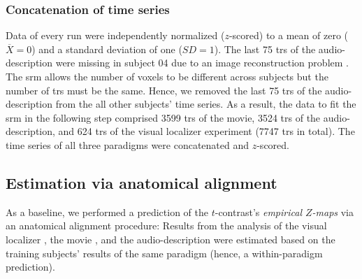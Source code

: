 \subsubsection{Concatenation of time series}


Data of every run were independently normalized ($z$-scored) to a mean of zero
($\overline{X}=0$) and a standard deviation of one ($SD=1$).
%
The last 75 \acp{tr} of the audio-description were missing in subject 04 due to
an image reconstruction problem \citep[s.][]{hanke2014audiomovie}.
%
The \ac{srm} allows the number of voxels to be different across subjects but the
number of \acp{tr} must be the same.
%
Hence, we removed the last 75 \acp{tr} of the audio-description from the all
other subjects' time series.
As a result, the data to fit the \ac{srm} in the following step comprised 3599
\acp{tr} of the movie, 3524 \acp{tr} of the audio-description, and 624 \acp{tr}
of the visual localizer experiment (7747 \acp{tr} in total).
The time series of all three paradigms were concatenated and $z$-scored.





\subsection{Estimation via anatomical alignment}



%
As a baseline, we performed a prediction of the $t$-contrast's \textit{empirical
$Z$-maps} via an anatomical alignment procedure:
%
Results from the analysis of
%
the visual localizer \citep{sengupta2016extension},
%
the movie \citep{haeusler2022processing}, and
%
the audio-description \citep{haeusler2022processing}
%
were estimated based on the training subjects' results of the same paradigm
(hence, a within-paradigm prediction).

